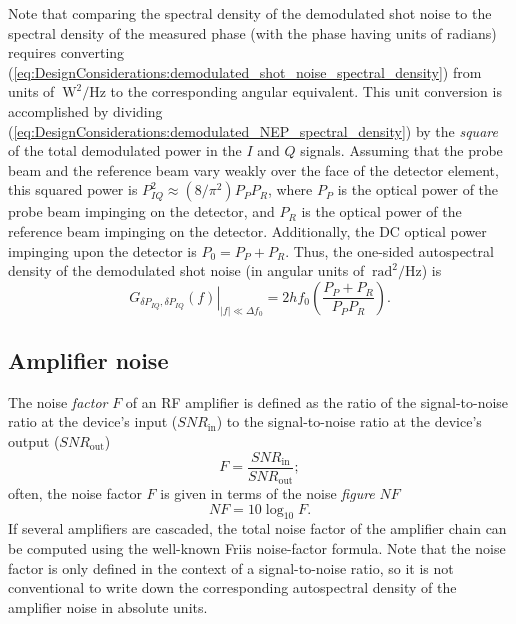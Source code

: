 Note that comparing the spectral density
of the demodulated shot noise
to the spectral density of the measured phase
(with the phase having units of radians)
requires converting
(\ref{eq:DesignConsiderations:demodulated_shot_noise_spectral_density})
from units of $\SI{}{\watt\squared\per\Hz}$
to the corresponding angular equivalent.
This unit conversion is accomplished by dividing
(\ref{eq:DesignConsiderations:demodulated_NEP_spectral_density})
by the \emph{square} of the total demodulated power in the $I$ and $Q$ signals.
Assuming that the probe beam and the reference beam
vary weakly over the face of the detector element,
this squared power is
$P_{IQ}^2 \approx (8 / \pi^2) P_P P_R$, where
$P_P$ is the optical power of the probe beam impinging on the detector, and
$P_R$ is the optical power of the reference beam impinging on the detector.
Additionally, the DC optical power impinging upon the detector is
$P_0 = P_P + P_R$.
Thus, the one-sided autospectral density of the demodulated shot noise
(in angular units of $\SI{}{\radian\squared\per\Hz}$) is
\begin{equation}
  \left.
    G_{\delta P_{IQ}, \delta P_{IQ}}(f)
  \right|_{|f| \ll \Delta f_0}
  =
  2 h f_0 \left( \frac{P_P + P_R}{P_P P_R} \right).
\end{equation}


\subsection{Amplifier noise}
The noise \emph{factor} $F$ of an RF amplifier is defined as the ratio of
the signal-to-noise ratio at the device's input ($SNR_{\text{in}}$) to
the signal-to-noise ratio at the device's output ($SNR_{\text{out}}$)
\begin{equation}
  F = \frac{SNR_{\text{in}}}{SNR_{\text{out}}};
\end{equation}
often, the noise factor $F$ is given
in terms of the noise \emph{figure} $NF$
\cite{minicircuits_amplifier_terms_defined}
\begin{equation}
  NF = 10 \log_{10} F.
\end{equation}
If several amplifiers are cascaded,
the total noise factor of the amplifier chain
can be computed using the well-known Friis noise-factor formula.
Note that the noise factor is only defined
in the context of a signal-to-noise ratio, so
it is not conventional to write down the corresponding
autospectral density of the amplifier noise in absolute units.


